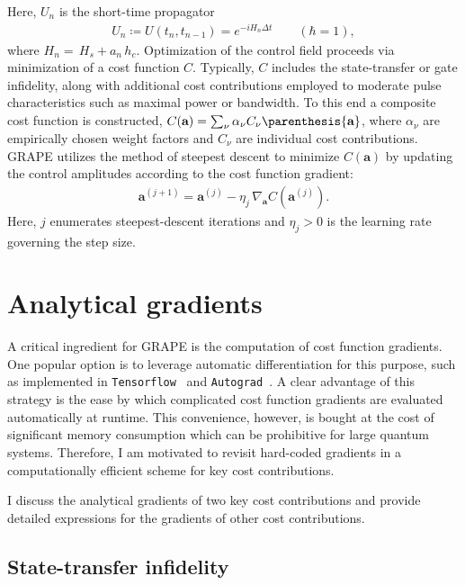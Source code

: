 Here, $U_n$ is the short-time propagator%
\begin{align}
\label{eq:propagator}
  U_n\coloneqq U(t_n, t_{n-1}) =e^{-iH_n\Delta t}\qquad(\hbar=1),
\end{align}
where $H_n=\, H_s+a_n\, h_c $. Optimization of the control field proceeds via minimization of a cost function $C$. Typically, $C$ includes the state-transfer or gate infidelity, along with additional cost contributions employed to moderate pulse characteristics such as maximal power or bandwidth. To this end a composite cost function is constructed, $C(\textbf{a})=\sum_{\nu}\alpha_\nu C_\nu \parenthesis{\textbf{a}}$, where $\alpha_\nu$ are empirically chosen weight factors and $C_\nu$ are individual cost contributions. GRAPE utilizes the method of steepest descent to minimize $C(\textbf{a})$ by updating the control amplitudes according to the cost function gradient: 
\begin{align}
\label{eq:grape_update}
  \textbf{a}^{(j+1)}=\textbf{a}^{(j)}-\eta_j\,\nabla_{\textbf{a}}C(\textbf{a}^{(j)}).
\end{align}
Here, $j$ enumerates steepest-descent iterations and $\eta_j>0$ is the learning rate governing the step size. 



\section{Analytical gradients}
\label{sec:analytical_gradients}

A critical ingredient for GRAPE is the computation of cost function gradients. One popular option is to leverage automatic differentiation for this purpose, such as implemented in \texttt{Tensorflow}~\cite{tensorflow2015-whitepaper} and \texttt{Autograd}~\cite{maclaurin2015autograd}. A clear advantage of this strategy is the ease by which complicated cost function gradients are evaluated automatically at runtime. This convenience, however, is bought at the cost of significant memory consumption which can be prohibitive for large quantum systems.
Therefore, I am motivated to revisit hard-coded gradients in a computationally efficient scheme for key cost contributions.

I discuss the analytical gradients of two key cost contributions and provide detailed expressions for the gradients of other cost contributions.

\subsection{State-transfer infidelity}

